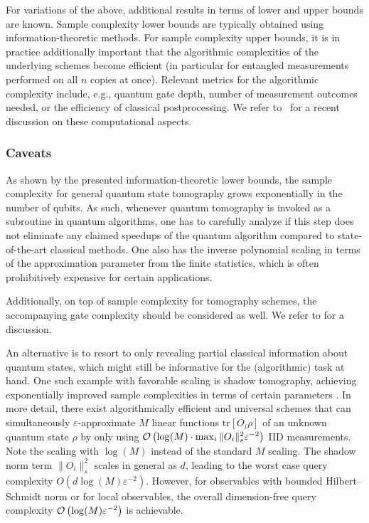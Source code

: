 \begin{refsection}
For variations of the above, additional results in terms of lower and upper bounds are known. Sample complexity lower bounds are typically obtained using information-theoretic methods. For sample complexity upper bounds, it is in practice additionally important that the algorithmic complexities of the underlying schemes become efficient (in particular for entangled measurements performed on all $n$ copies at once). Relevant metrics for the algorithmic complexity include, e.g., quantum gate depth, number of measurement outcomes needed, or the efficiency of classical postprocessing. We refer to~\cite{lowe2022lowerboundquantumtomo} for a recent discussion on these computational aspects.


\subsubsection*{Caveats}

As shown by the presented information-theoretic lower bounds, the sample complexity for general quantum state tomography grows exponentially in the number of qubits. As such, whenever quantum tomography is invoked as a subroutine in quantum algorithms, one has to carefully analyze if this step does not eliminate any claimed speedups of the quantum algorithm compared to state-of-the-art classical methods. One also has the inverse polynomial scaling in terms of the approximation parameter from the finite statistics, which is often prohibitively expensive for certain applications.

Additionally, on top of sample complexity for tomography schemes, the accompanying gate complexity should be considered as well. We refer to \cite{apeldoorn2022TomographyStatePreparationUnitaries} for a discussion.

An alternative is to resort to only revealing partial classical information about quantum states, which might still be informative for the (algorithmic) task at hand. One such example with favorable scaling is shadow tomography, achieving exponentially improved sample complexities in terms of certain parameters \cite{aaronson2018ShadowTomography,aaronson2018onlinelearningqstate,huang2020predicitingmanypropfewmeas}. In more detail, there exist algorithmically efficient and universal schemes that can simultaneously $\varepsilon$-approximate $M$ linear functions $\mathrm{tr}[O_i\rho]$ of an unknown quantum state $\rho$ by only using $\mathcal{O}\left( \log(M)\cdot\max_i\|O_i\|^2_{s}\varepsilon^{-2} \right)$ IID measurements. Note the scaling with $\log(M)$ instead of the standard $M$ scaling. The shadow norm term $\|O_i\|^2_{s}$ scales in general as $d$, leading to the worst case query complexity $O\left(d\log(M)\varepsilon^{-2}\right)$. However, for observables with bounded Hilbert--Schmidt norm or for local observables, the overall dimension-free query complexity $\mathcal{O}\left( \log(M)\varepsilon^{-2} \right)$ is achievable.


\end{refsection}
